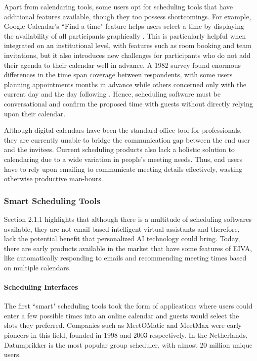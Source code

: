 \documentclass{article}
\begin{document}
Apart from calendaring tools, some users opt for scheduling tools that have additional features available, though they too possess shortcomings. For example, Google Calendar's ``Find a time" feature helps users select a time by displaying the availability of all participants graphically \cite{noauthor_google_2016}. This is particularly helpful when integrated on an institutional level, with features such as room booking and team invitations, but it also introduces new challenges for participants who do not add their agenda to their calendar well in advance. A 1982 survey found enormous differences in the time span coverage between respondents, with some users planning appointments months in advance while others concerned only with the current day and the day following \cite{kelley_how_1982}. Hence, scheduling software must be conversational and confirm the proposed time with guests without directly relying upon their calendar.

Although digital calendars have been the standard office tool for professionals, they are currently unable to bridge the communication gap between the end user and the invitees. Current scheduling products also lack a holistic solution to calendaring due to a wide variation in people's meeting needs. Thus, end users have to rely upon emailing to communicate meeting details effectively, wasting otherwise productive man-hours.

\subsubsection{Smart Scheduling Tools}

Section 2.1.1 highlights that although there is a multitude of scheduling softwares available, they are not email-based intelligent virtual assistants and therefore, lack the potential benefit that personalized AI technology could bring. Today, there are early products available in the market that have some features of EIVA, like automatically responding to emails and recommending meeting times based on multiple calendars.

\paragraph{Scheduling Interfaces}

The first ``smart" scheduling tools took the form of applications where users could enter a few possible times into an online calendar and guests would select the slots they preferred. Companies such as MeetOMatic and MeetMax were early pioneers in this field, founded in 1998 and 2003 respectively. In the Netherlands, Datumprikker is the most popular group scheduler, with almost 20 million unique users.
\end{document}
